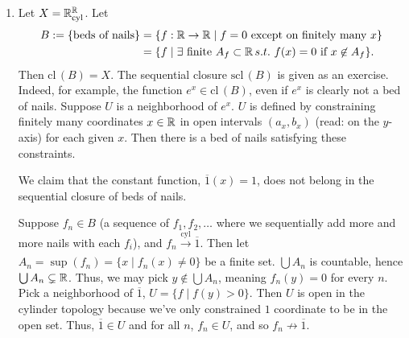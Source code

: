 \begin{enumerate}[label=(\alph*)]
    \newpage
    \item Let $X = \mathbb R_\mathrm{cyl}^\mathbb R$. Let
    \begin{align*}
        B := \{\text{beds of nails}\} &= \{f : \mathbb R \to \mathbb R \mid f = 0 \text{ except on finitely many } x\} \\
        &= \{ f \mid \exists \text{ finite } A_f \subset \mathbb R \, s.t. \,\, f(x) = 0 \text{ if } x \not\in A_f \}.
    \end{align*}
    Then $\mathrm{cl}\,(B) = X$. The sequential closure $\mathrm{scl}\,(B)$ is given as an exercise. Indeed, for example, the function $e^x \in \mathrm{cl}\,(B)$, even if $e^x$ is clearly not a bed of nails. Suppose $U$ is a neighborhood of $e^x$. $U$ is defined by constraining finitely many coordinates $x \in \mathbb R$ in open intervals $(a_x, b_x)$ (read: on the $y$-axis) for each given $x$. Then there is a bed of nails satisfying these constraints.
    \begin{simpleclaim}
        We claim that the constant function, $\overline{1}(x) = 1$, does not belong in the sequential closure of beds of nails.
    \end{simpleclaim}
    Suppose $f_n \in B$ (a sequence of $f_1, f_2, \dots$ where we sequentially add more and more nails with each $f_i$), and $f_n \xrightarrow[]{\mathrm{cyl}} \overline{1}$. Then let $A_n = \sup (f_n) = \{ x \mid f_n(x) \neq 0 \}$ be a finite set. $\bigcup A_n$ is countable, hence $\bigcup A_n \subsetneq \mathbb R$. Thus, we may pick $y \not\in \bigcup A_n$, meaning $f_n(y) = 0$ for every $n$.
    \medskip\newline
    Pick a neighborhood of $\overline{1}$, $U = \{f \mid f(y) > 0 \}$. Then $U$ is open in the cylinder topology because we've only constrained $1$ coordinate to be in the open set. Thus, $\overline{1} \in U$ and for all $n$, $f_n \in U$, and so $f_n \not\to \overline{1}$.
\end{enumerate}

